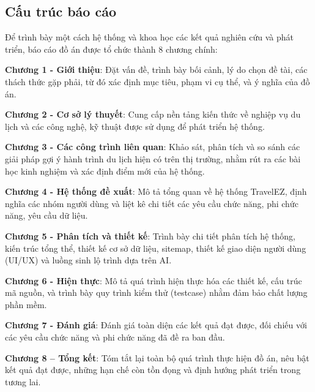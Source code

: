 \subsection{Cấu trúc báo cáo}
Để trình bày một cách hệ thống và khoa học các kết quả nghiên cứu và phát triển, báo cáo đồ án được tổ chức thành 8 chương chính:

\textbf{Chương 1 - Giới thiệu}: Đặt vấn đề, trình bày bối cảnh, lý do chọn đề tài, các thách thức gặp phải, từ đó xác định mục tiêu, phạm vi cụ thể, và ý nghĩa của đồ án.

\textbf{Chương 2 - Cơ sở lý thuyết}: Cung cấp nền tảng kiến thức về nghiệp vụ du lịch và các công nghệ, kỹ thuật được sử dụng để phát triển hệ thống.

\textbf{Chương 3 - Các công trình liên quan}: Khảo sát, phân tích và so sánh các giải pháp gợi ý hành trình du lịch hiện có trên thị trường, nhằm rút ra các bài học kinh nghiệm và xác định điểm mới của hệ thống.

\textbf{Chương 4 - Hệ thống đề xuất}: Mô tả tổng quan về hệ thống TravelEZ, định nghĩa các nhóm người dùng và liệt kê chi tiết các yêu cầu chức năng, phi chức năng, yêu cầu dữ liệu.

\textbf{Chương 5 - Phân tích và thiết kế}: Trình bày chi tiết phân tích hệ thống, kiến trúc tổng thể, thiết kế cơ sở dữ liệu, sitemap, thiết kế giao diện người dùng (UI/UX) và luồng sinh lộ trình dựa trên AI.

\textbf{Chương 6 - Hiện thực}: Mô tả quá trình hiện thực hóa các thiết kế, cấu trúc mã nguồn, và trình bày quy trình kiểm thử (testcase) nhằm đảm bảo chất lượng phần mềm.

\textbf{Chương 7 - Đánh giá}: Đánh giá toàn diện các kết quả đạt được, đối chiếu với các yêu cầu chức năng và phi chức năng đã đề ra ban đầu.

\textbf{Chương 8 – Tổng kết}: Tóm tắt lại toàn bộ quá trình thực hiện đồ án, nêu bật kết quả đạt được, những hạn chế còn tồn đọng và định hướng phát triển trong tương lai.
